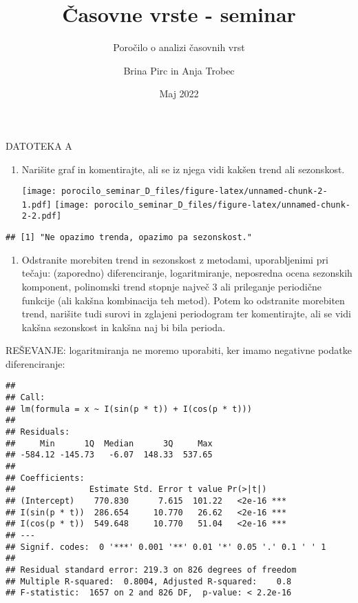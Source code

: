 \documentclass[
]{article}
\title{Časovne vrste - seminar}
\subtitle{Poročilo o analizi časovnih vrst}
\author{Brina Pirc in Anja Trobec}
\date{Maj 2022}
\providecommand{\tightlist}{%
  \setlength{\itemsep}{0pt}\setlength{\parskip}{0pt}}
\begin{document}
\maketitle

DATOTEKA A

\begin{enumerate}
\def\labelenumi{\arabic{enumi}.}
\tightlist
\item
  Narišite graf in komentirajte, ali se iz njega vidi kakšen trend ali
  sezonskost.

  \texttt{[image: porocilo\_seminar\_D\_files/figure-latex/unnamed-chunk-2-1.pdf]}
  \texttt{[image: porocilo\_seminar\_D\_files/figure-latex/unnamed-chunk-2-2.pdf]}
\end{enumerate}

\begin{verbatim}
## [1] "Ne opazimo trenda, opazimo pa sezonskost."
\end{verbatim}

\begin{enumerate}
\def\labelenumi{\arabic{enumi}.}
\setcounter{enumi}{1}
\tightlist
\item
  Odstranite morebiten trend in sezonskost z metodami, uporabljenimi pri
  tečaju: (zaporedno) diferenciranje, logaritmiranje, neposredna ocena
  sezonskih komponent, polinomski trend stopnje največ 3 ali prileganje
  periodične funkcije (ali kakšna kombinacija teh metod). Potem ko
  odstranite morebiten trend, narišite tudi surovi in zglajeni
  periodogram ter komentirajte, ali se vidi kakšna sezonskost in kakšna
  naj bi bila perioda.
\end{enumerate}

REŠEVANJE: logaritmiranja ne moremo uporabiti, ker imamo negativne
podatke diferenciranje:

\begin{verbatim}
## 
## Call:
## lm(formula = x ~ I(sin(p * t)) + I(cos(p * t)))
## 
## Residuals:
##     Min      1Q  Median      3Q     Max 
## -584.12 -145.73   -6.07  148.33  537.65 
## 
## Coefficients:
##               Estimate Std. Error t value Pr(>|t|)    
## (Intercept)    770.830      7.615  101.22   <2e-16 ***
## I(sin(p * t))  286.654     10.770   26.62   <2e-16 ***
## I(cos(p * t))  549.648     10.770   51.04   <2e-16 ***
## ---
## Signif. codes:  0 '***' 0.001 '**' 0.01 '*' 0.05 '.' 0.1 ' ' 1
## 
## Residual standard error: 219.3 on 826 degrees of freedom
## Multiple R-squared:  0.8004, Adjusted R-squared:    0.8 
## F-statistic:  1657 on 2 and 826 DF,  p-value: < 2.2e-16
\end{verbatim}
\end{document}
